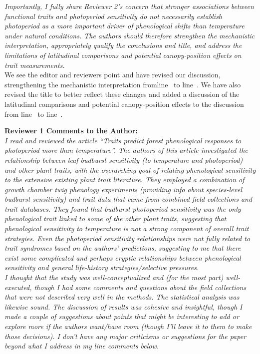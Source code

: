 \documentclass[11pt,a4paper]{article}
\newcommand{\lr}[1]{line~\lineref{#1}}
\begin{document}
\emph{ Importantly, I fully share Reviewer 2's concern that stronger associations between functional traits and photoperiod sensitivity do not necessarily establish photoperiod as a more important driver of phenological shifts than temperature under natural conditions. The authors should therefore strengthen the mechanistic interpretation, appropriately qualify the conclusions and title, and address the limitations of latitudinal comparisons and potential canopy-position effects on trait measurements.}\\

We see the editor and reviewers point and have revised our discussion, strengthening the mechanistic interpretation from\lr{X} to \lr{Y}. We have also revised the title to better reflect these changes and added a discussion of the latitudinal comparisons and potential canopy-position effects to the discussion from \lr{X} to \lr{Y}.  

\textbf{Reviewer 1 Comments to the Author:}\\
 
\emph{I read and reviewed the article “Traits predict forest phenological responses to photoperiod more than temperature”. The authors of this article investigated the relationship between leaf budburst sensitivity (to temperature and photoperiod) and other plant traits, with the overarching goal of relating phenological sensitivity to the extensive existing plant trait literature. They employed a combination of growth chamber twig phenology experiments (providing info about species-level budburst sensitivity) and trait data that came from combined field collections and trait databases. They found that budburst photoperiod sensitivity was the only phenological trait linked to some of the other plant traits, suggesting that phenological sensitivity to temperature is not a strong component of overall trait strategies. Even the photoperiod sensitivity relationships were not fully related to trait syndromes based on the authors’ predictions, suggesting to me that there exist some complicated and perhaps cryptic relationships between phenological sensitivity and general life-history strategies/selective pressures.}\\

\emph{I thought that the study was well-conceptualized and (for the most part) well-executed, though I had some comments and questions about the field collections that were not described very well in the methods. The statistical analysis was likewise sound. The discussion of results was cohesive and insightful, though I made a couple of suggestions about points that might be interesting to add or explore more if the authors want/have room (though I’ll leave it to them to make those decisions). I don’t have any major criticisms or suggestions for the paper beyond what I address in my line comments below.}
\end{document}
